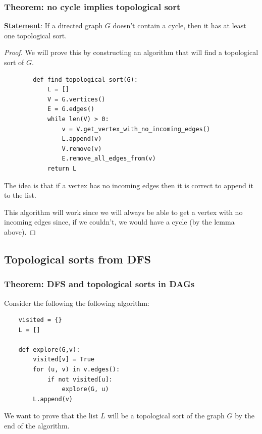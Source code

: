\documentclass[12pt]{extarticle}
\begin{document}
\subsubsection{Theorem: no cycle implies topological sort}

\textbf{\underline{Statement}}: If a directed graph $G$ doesn't contain a cycle,
then it has at least one topological sort.

\begin{proof}
    We will prove this by constructing an algorithm that will find a topological sort of $G$.

    \begin{verbatim}
        def find_topological_sort(G):
            L = []
            V = G.vertices()
            E = G.edges()
            while len(V) > 0:
                v = V.get_vertex_with_no_incoming_edges()
                L.append(v)
                V.remove(v)
                E.remove_all_edges_from(v)
            return L
    \end{verbatim}

    The idea is that if a vertex has no incoming edges then it is correct to append it to the list.

    This algorithm will work since we will always be able to get a vertex with no incoming edges since, if we couldn't, we would have a cycle (by the lemma above).

\end{proof}

\subsection{Topological sorts from DFS}

\subsubsection{Theorem: DFS and topological sorts in DAGs}

Consider the following the following algorithm:

\begin{verbatim}
    visited = {}
    L = []

    def explore(G,v):
        visited[v] = True
        for (u, v) in v.edges():
            if not visited[u]:
                explore(G, u)
        L.append(v)
\end{verbatim}

We want to prove that the list $L$ will be a topological sort of the graph $G$ by the end of the algorithm.
\end{document}
